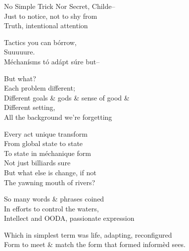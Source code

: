 No Simple Trick Nor Secret, Childe-- \\
Just to notice, not to shy from \\
Truth, intentional attention

Tactics you can bórrow, \\
Suuuuure. \\
Méchanísms tó adápt súre but--

But what? \\
Each problem different; \\
Different goals \& gods \& sense of good \& \\
Different setting, \\
All the background we're forgetting

Every act unique transform \\
From global state to state \\
To state in méchanique form \\
Not just billiards sure \\
But what else is change, if not \\
The yawning mouth of rivers?

So many words \& phrases coined \\
In efforts to control the waters, \\
Intellect and OODA, passionate expression

Which in simplest term was life, adapting, reconfigured \\
Form to meet \& match the form that formed informèd sees.